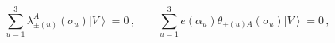 \begin{equation}\label{fermcont}
\sum_{u=1}^3 \lambda^A_{\pm(u)}(\sigma_u)\left|V\right>=0\,,\qquad 
\sum_{u=1}^3e(\alpha_u)\theta_{\pm(u)A}(\sigma_u)\left|V\right>=0\,,
\end{equation}

